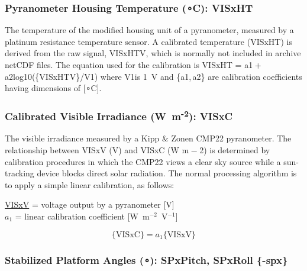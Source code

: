 \documentclass[
]{book}
\begin{document}
\hypertarget{visxht}{%
\subsubsection*{\texorpdfstring{Pyranometer Housing Temperature ({∘}C): VISxHT}{Pyranometer Housing Temperature (∘C): VISxHT}}\label{visxht}}

The temperature of the modified housing unit of a pyranometer, measured by a platinum resistance temperature sensor. A calibrated temperature (VISxHT) is derived from the raw signal, VISxHTV, which is normally not included in archive netCDF files. The equation used for the calibration is VISxHT = {a1 + a2log10}(\{VISxHTV\}/{V1}) where {V1}is 1~V and {\{a1, a2\}} are calibration coefficients having dimensions of {{[}{∘}C{]}}.

\hypertarget{visxc}{%
\subsubsection*{\texorpdfstring{Calibrated Visible Irradiance (W~m\textsuperscript{-2}): VISxC}{Calibrated Visible Irradiance (W~m-2): VISxC}}\label{visxc}}

The visible irradiance measured by a Kipp \& Zonen CMP22 pyranometer. The relationship between VISxV (V) and VISxC (W m{ − 2}) is determined by calibration procedures in which the CMP22 views a clear sky source while a sun-tracking device blocks direct solar radiation. The normal processing algorithm is to apply a simple linear calibration, as follows:

\protect\hyperlink{visxv}{VISxV} = voltage output by a pyranometer {[}V{]}\\
\(a_{1}\) = linear calibration coefficient {[}W~m\(^{-2}\)~V\(^{-1}\){]}

\begin{equation}
\mathrm{\{VISxC\}}=a_{1}\mathrm{\{VISxV\}}
\label{eq:VISxC}
\end{equation}

\hypertarget{stabilized-platform-angles-spxpitch-spxroll--spx}{%
\subsubsection{\texorpdfstring{Stabilized Platform Angles ({∘}): SPxPitch, SPxRoll \{-spx\}}{Stabilized Platform Angles (∘): SPxPitch, SPxRoll \{-spx\}}}\label{stabilized-platform-angles-spxpitch-spxroll--spx}}
\end{document}
